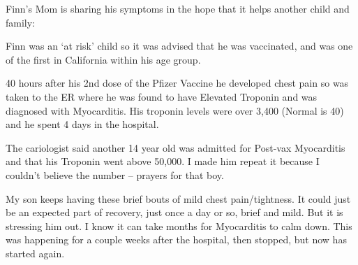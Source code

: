 Finn’s Mom is sharing his symptoms in the hope that it helps another child and
family:

Finn was an ‘at risk’ child so it was advised that he was vaccinated, and was
one of the first in California within his age group.

40 hours after his 2nd dose of the Pfizer Vaccine he developed chest pain so was
taken to the ER where he was found to have Elevated Troponin and was diagnosed
with Myocarditis. His troponin levels were over 3,400 (Normal is 40) and he
spent 4 days in the hospital.

The cariologist said another 14 year old was admitted for Post-vax Myocarditis
and that his Troponin went above 50,000. I made him repeat it because I couldn’t
believe the number – prayers for that boy.

My son keeps having these brief bouts of mild chest pain/tightness. It could
just be an expected part of recovery, just once a day or so, brief and mild. But
it is stressing him out. I know it can take months for Myocarditis to calm
down. This was happening for a couple weeks after the hospital, then stopped,
but now has started again.


